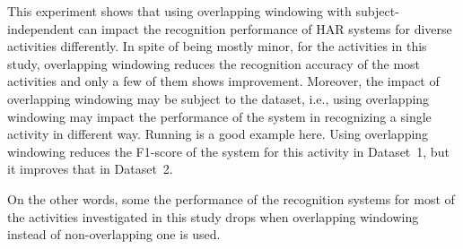 \documentclass[sensors,article,submit,moreauthors,pdftex]{Definitions/mdpi}
\begin{document}
This experiment shows that using overlapping windowing with subject-independent can impact the recognition performance of HAR systems for diverse activities differently. In spite of being mostly minor, for the activities in this study, overlapping windowing reduces the recognition accuracy of the most activities and only a few of them shows improvement. Moreover, the impact of overlapping windowing may be subject to the dataset, i.e., using overlapping windowing may impact the performance of the system in recognizing a single activity in different way. Running is a good example here. Using overlapping windowing reduces the F1-score of the system for this activity in Dataset~1, but it improves that in Dataset~2.  

On the other words, some  
the performance of the recognition systems for most of the activities investigated in this study drops when overlapping windowing instead of non-overlapping one is used.    
\end{document}
